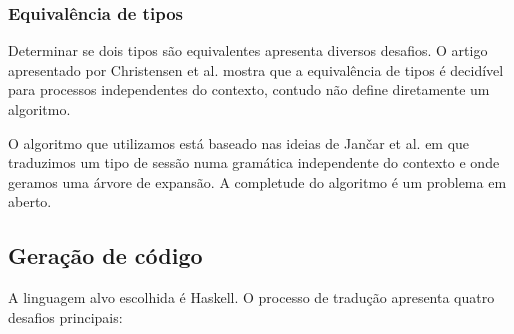 \subsubsection{Equivalência de tipos}

Determinar se dois tipos são equivalentes apresenta diversos desafios. O artigo apresentado por Christensen et al. \cite{decidable-CFP-bisimilarity} mostra que a equivalência de tipos é decidível para processos independentes do contexto, contudo não define diretamente um algoritmo.

O algoritmo que utilizamos está baseado nas ideias de Jančar et al. \cite{bisimilarity} em que traduzimos um tipo de sessão numa gramática independente do contexto e onde geramos uma árvore de expansão. A completude do algoritmo é um problema em aberto.



\subsection{Geração de código}
A linguagem alvo escolhida é Haskell. O processo de tradução apresenta quatro desafios principais:


